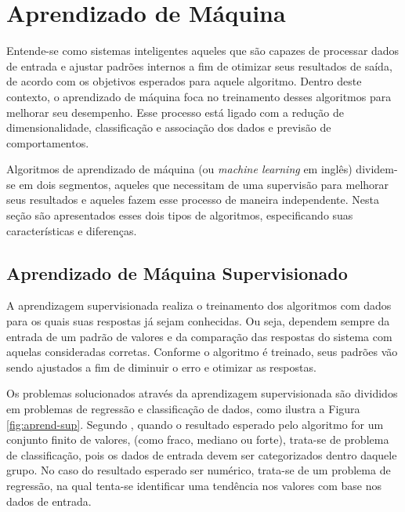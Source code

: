 \documentclass[oneside,openright,12pt]{ufsm_2015} %
\begin{document}

\section{Aprendizado de Máquina}
\label{sec:fund-aprend-maquina}

    \par Entende-se como sistemas inteligentes aqueles que são capazes de processar dados de entrada e ajustar padrões internos a fim de otimizar seus resultados de saída, de acordo com os objetivos esperados para aquele algoritmo. Dentro deste contexto, o aprendizado de máquina foca no treinamento desses algoritmos para melhorar seu desempenho. Esse processo está ligado com a redução de dimensionalidade, classificação e associação dos dados e previsão de comportamentos.

    \par Algoritmos de aprendizado de máquina (ou \textit{machine learning} em inglês) dividem-se em dois segmentos, aqueles que necessitam de uma supervisão para melhorar seus resultados e aqueles fazem esse processo de maneira independente. Nesta seção são apresentados esses dois tipos de algoritmos, especificando suas características e diferenças.


\subsection{Aprendizado de Máquina Supervisionado}
\label{sec:fund-am-sup}

    \par A aprendizagem supervisionada realiza o treinamento dos algoritmos com dados para os quais suas respostas já sejam conhecidas. Ou seja, dependem sempre da entrada de um padrão de valores e da comparação das respostas do sistema com aquelas consideradas corretas. Conforme o algoritmo é treinado, seus padrões vão sendo ajustados a fim de diminuir o erro e otimizar as respostas. 

    \par Os problemas solucionados através da aprendizagem supervisionada são divididos em problemas de regressão e classificação de dados, como ilustra a Figura \ref{fig:aprend-sup}. Segundo \cite{book:russell:10}, quando o resultado esperado pelo algoritmo for um conjunto finito de valores, (como fraco, mediano ou forte), trata-se de problema de classificação, pois os dados de entrada devem ser categorizados dentro daquele grupo. No caso do resultado esperado ser numérico, trata-se de um problema de regressão, na qual tenta-se identificar uma tendência nos valores com base nos dados de entrada.
\end{document}
